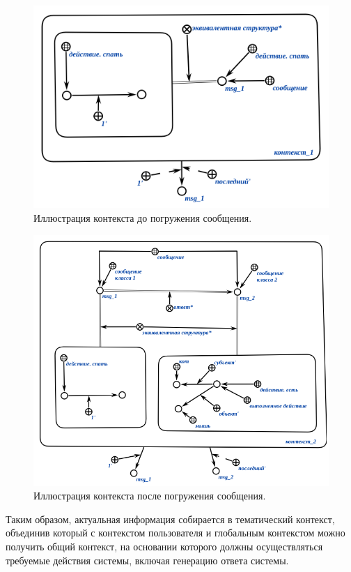 \begin{figure}[h]
    \centering
    \includegraphics[scale=0.8]{images/part4/chapter_nl_interfaces/context_1}
    \caption{Иллюстрация контекста до погружения сообщения.}
    \label{fig:context_before_update}
\end{figure}

\begin{figure}[h]
    \centering
    \includegraphics[scale=0.8]{images/part4/chapter_nl_interfaces/context_2}
    \caption{Иллюстрация контекста после погружения сообщения.}
    \label{fig:updated_context}
\end{figure}

Таким образом, актуальная информация собирается в тематический контекст, объединив который с контекстом пользователя и глобальным контекстом можно получить общий контекст, на основании которого должны осуществляться требуемые действия системы, включая генерацию ответа системы.


